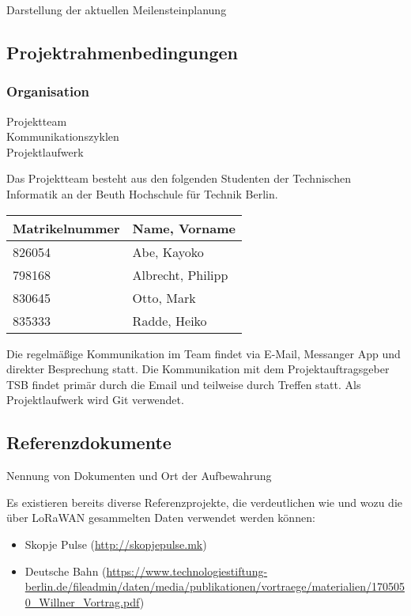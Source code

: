 \documentclass[
11pt,
a4paper,
ngerman,
]{article}
\newcommand{\descriptionWhat}[1]{%
	\begin{itshape}%
	#1 \\%
	\end{itshape}%
}
\begin{document}
\descriptionWhat{Darstellung der aktuellen Meilensteinplanung}

\subsection{Projektrahmenbedingungen}

\subsubsection{Organisation}

\descriptionWhat{ Projektteam \\ Kommunikationszyklen \\ Projektlaufwerk }

Das Projektteam besteht aus den folgenden Studenten der Technischen Informatik an der Beuth Hochschule für Technik Berlin.

\begin{table}[H]
	\centering
	\begin{tabular}{ |l|l| }
		\hline  %
		\rowcolor[gray]{.8}%
		\rule{0pt}{18pt}%
		\textbf{Matrikelnummer} & \textbf{Name, Vorname} \\
		\hline  %
		826054 & Abe, Kayoko \\
		\hline
		798168 & Albrecht, Philipp \\
		\hline
		830645 & Otto, Mark \\
		\hline
		835333 & Radde, Heiko \\
		\hline
	\end{tabular}
\end{table}

Die regelmäßige Kommunikation im Team findet via E-Mail, Messanger App und direkter Besprechung statt. Die Kommunikation mit dem Projektauftragsgeber TSB findet primär durch die Email und teilweise durch Treffen statt.
Als Projektlaufwerk wird Git verwendet.

\subsection{Referenzdokumente}

\descriptionWhat{ Nennung von Dokumenten und Ort der Aufbewahrung }

Es existieren bereits diverse Referenzprojekte, die verdeutlichen wie und wozu die über LoRaWAN gesammelten Daten verwendet werden können:

\begin{itemize}[noitemsep]
	\item Skopje Pulse (\url{http://skopjepulse.mk})
	\item Deutsche Bahn (\url{https://www.technologiestiftung-berlin.de/fileadmin/daten/media/publikationen/vortraege/materialien/1705050_Willner_Vortrag.pdf})
\end{itemize}
\end{document}
